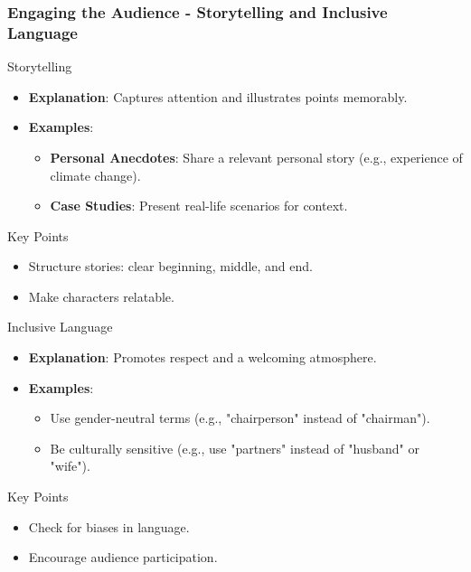 \documentclass[aspectratio=169]{beamer}
\begin{document}
\begin{frame}[fragile]
  \frametitle{Engaging the Audience - Storytelling and Inclusive Language}
  \begin{block}{Storytelling}
      \begin{itemize}
          \item \textbf{Explanation}: Captures attention and illustrates points memorably.
          \item \textbf{Examples}:
          \begin{itemize}
              \item \textbf{Personal Anecdotes}: Share a relevant personal story (e.g., experience of climate change).
              \item \textbf{Case Studies}: Present real-life scenarios for context.
          \end{itemize}
      \end{itemize}
      \begin{block}{Key Points}
          \begin{itemize}
              \item Structure stories: clear beginning, middle, and end.
              \item Make characters relatable.
          \end{itemize}
      \end{block}
  \end{block}

  \begin{block}{Inclusive Language}
      \begin{itemize}
          \item \textbf{Explanation}: Promotes respect and a welcoming atmosphere.
          \item \textbf{Examples}:
          \begin{itemize}
              \item Use gender-neutral terms (e.g., "chairperson" instead of "chairman").
              \item Be culturally sensitive (e.g., use "partners" instead of "husband" or "wife").
          \end{itemize}
      \end{itemize}
      \begin{block}{Key Points}
          \begin{itemize}
              \item Check for biases in language.
              \item Encourage audience participation.
          \end{itemize}
      \end{block}
  \end{block}
\end{frame}
\end{document}
